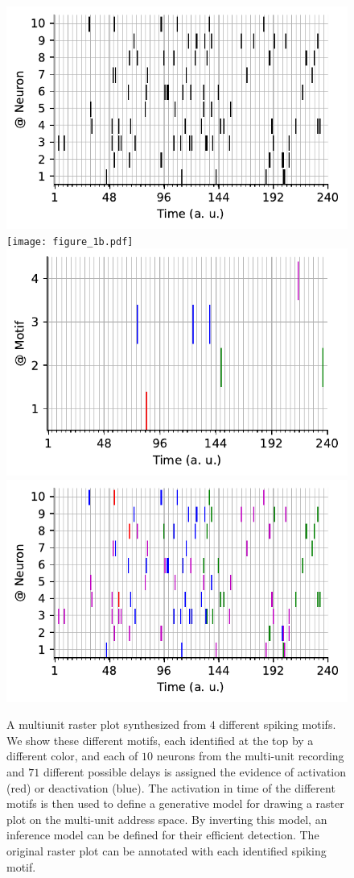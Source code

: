 \documentclass[11pt]{article}
\begin{document}
%
\begin{figure}[h!]%
    \includegraphics[width=.25\linewidth]{figure_1a_k.pdf}
    \texttt{[image: figure\_1b.pdf]}
  \includegraphics[width=.25\linewidth]{figure_1c.pdf}
    \includegraphics[width=.25\linewidth]{figure_1a.pdf}
{
\caption{A multiunit raster plot synthesized from $4$ different spiking motifs. We show these different motifs, each identified at the top by a different color, and each of $10$ neurons from the multi-unit recording and $71$ different possible delays is assigned the evidence of activation (red) or deactivation (blue). The activation in time of the different motifs is then used to define a generative model for drawing a raster plot on the multi-unit address space. By inverting this model, an inference model can be defined for their efficient detection. The original raster plot can be annotated with each identified spiking motif.
}
\label{fig:1}
}
\vspace{-5pt}
\end{figure}%
%
%
\end{document}
